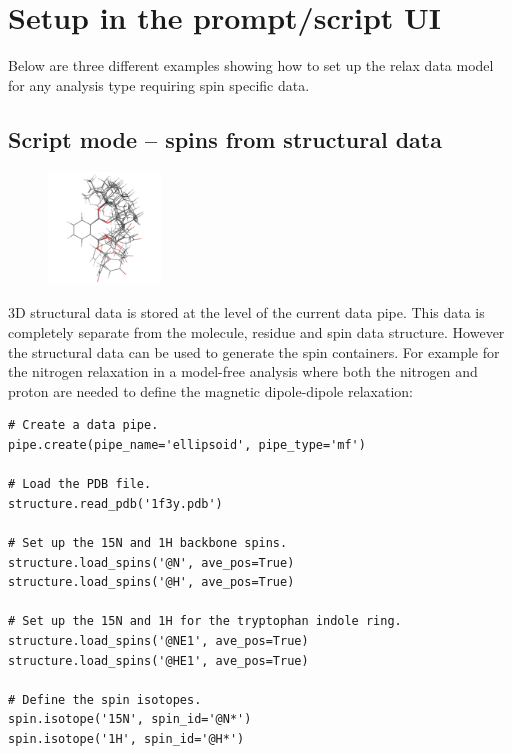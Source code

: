 \section{Setup in the prompt/script UI}

Below are three different examples showing how to set up the relax data model for any analysis type requiring spin specific data.



\subsection{Script mode -- spins from structural data} \label{sect: script - structural data}

\begin{figure}[h]
  \includegraphics[width=3cm, bb=0 0 1701 1701]{graphics/misc/n_state_model/phthalic_acid_ens_600x600}
\end{figure}

3D structural data is stored at the level of the current data pipe.
This data is completely separate from the molecule, residue and spin data structure.
However the structural data can be used to generate the spin containers.
For example for the nitrogen relaxation in a model-free analysis where both the nitrogen and proton are needed to define the magnetic dipole-dipole relaxation:

\begin{lstlisting}
# Create a data pipe.
pipe.create(pipe_name='ellipsoid', pipe_type='mf')

# Load the PDB file.
structure.read_pdb('1f3y.pdb')

# Set up the 15N and 1H backbone spins.
structure.load_spins('@N', ave_pos=True)
structure.load_spins('@H', ave_pos=True)

# Set up the 15N and 1H for the tryptophan indole ring.
structure.load_spins('@NE1', ave_pos=True)
structure.load_spins('@HE1', ave_pos=True)

# Define the spin isotopes.
spin.isotope('15N', spin_id='@N*')
spin.isotope('1H', spin_id='@H*')
\end{lstlisting}

